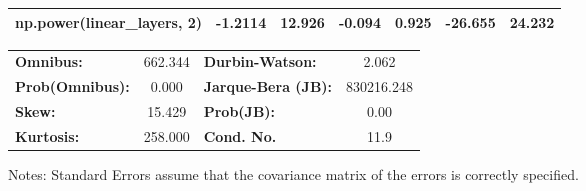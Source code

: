 \begin{center}
\begin{tabular}{lcccccc}
\textbf{np.power(linear\_layers, 2)}      &      -1.2114  &       12.926     &    -0.094  &         0.925        &      -26.655    &       24.232     \\
\bottomrule
\end{tabular}
\begin{tabular}{lclc}
\textbf{Omnibus:}       & 662.344 & \textbf{  Durbin-Watson:     } &     2.062   \\
\textbf{Prob(Omnibus):} &   0.000 & \textbf{  Jarque-Bera (JB):  } & 830216.248  \\
\textbf{Skew:}          &  15.429 & \textbf{  Prob(JB):          } &      0.00   \\
\textbf{Kurtosis:}      & 258.000 & \textbf{  Cond. No.          } &      11.9   \\
\bottomrule
\end{tabular}
\end{center}

Notes: \newline
 [1] Standard Errors assume that the covariance matrix of the errors is correctly specified.
